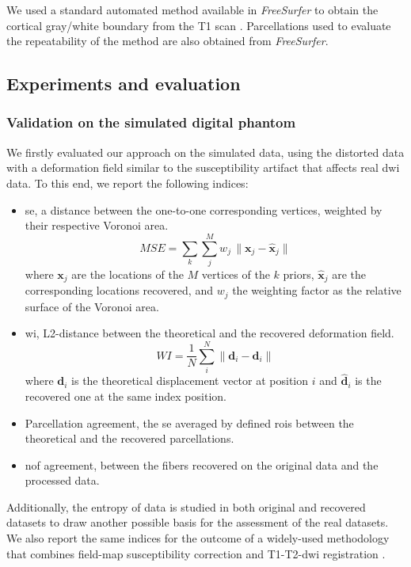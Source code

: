 We used a standard automated method 
available in \emph{FreeSurfer} \citep{fischl_freesurfer_2012} to obtain the
cortical gray/white boundary from the T1 scan \citep{greve_accurate_2009}.
Parcellations used to evaluate the repeatability of the method are also
obtained from \emph{FreeSurfer}.


\subsection{Experiments and evaluation}
\label{sec:experiments_evaluation}
%
\subsubsection{Validation on the simulated digital phantom} %
\label{sec:validation_phantom}
We firstly evaluated our approach on the simulated data, using
the distorted data with a deformation field similar to the
susceptibility artifact that affects real \gls{dwi} data. To 
this end, we report the following indices:
\begin{itemize}
\item \gls{se}, a distance between the one-to-one corresponding
vertices, weighted by their respective Voronoi area.
\begin{equation}
MSE = \sum\limits_k \sum\limits_j^M w_j\,\| \mathbf{x}_j - \hat{\mathbf{x}}_j \|
\end{equation}
where $\mathbf{x}_j$ are the locations of the $M$ vertices of the $k$ priors,
$\hat{\mathbf{x}}_j$ are the corresponding locations recovered, and $w_j$ the
weighting factor as the relative surface of the Voronoi area.
\item \gls{wi}, L2-distance between the theoretical and the recovered
deformation field.
\begin{equation}
WI = \frac{1}{N} \sum\limits_i^N \| \mathbf{d}_i - \hat{\mathbf{d}}_i \|
\end{equation}
where $\mathbf{d}_i$ is the theoretical displacement vector at position $i$
and $\hat{\mathbf{d}}_i$ is the recovered one at the same index position.
\item Parcellation agreement, the \gls{se} averaged by defined \glspl{roi}
between the theoretical and the recovered parcellations.
\item \gls{nof} agreement, between the fibers recovered on the original
data and the processed data.
\end{itemize}

Additionally, the entropy of data is studied in both
original and recovered datasets to draw another possible basis for the 
assessment of the real datasets. We also report the same indices for the
outcome of a widely-used methodology that combines field-map susceptibility 
correction and T1-T2-\gls{dwi} registration .

